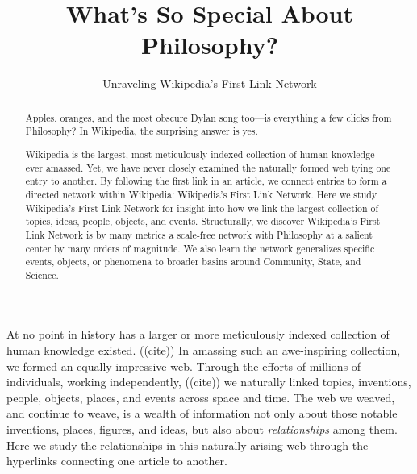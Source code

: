 \documentclass[twoside]{article}
\title{\vspace{-5mm}%
	\fontsize{24pt}{12pt}\selectfont
	\textbf{What's So Special About Philosophy?} 
	}
\author{%
\fontsize{14pt}{14pt}\selectfont
	Unraveling Wikipedia's First Link Network \vspace{-2mm}\\
	}
\date{}
\newcommand{\green}[1]{{\leavevmode\color{javagreen}{#1}}} %
\begin{document}
\maketitle
\thispagestyle{fancy}

\begin{abstract}
\fontsize{12pt}{12pt}
\selectfont

Apples, oranges, and the most obscure Dylan song too---is everything a few clicks from Philosophy? In Wikipedia, the surprising answer is yes. 

Wikipedia is the largest, most meticulously indexed collection of human knowledge ever amassed. Yet, we have never closely examined the naturally formed web tying one entry to another. By following the first link in an article, we connect entries to form a directed network within Wikipedia: Wikipedia's First Link Network. Here we study Wikipedia's First Link Network for insight into how we link the largest collection of topics, ideas, people, objects, and events.  Structurally, we discover Wikipedia's First Link Network is by many metrics a scale-free network with Philosophy at a salient center by many orders of magnitude. 
We also learn the network generalizes specific events, objects, or phenomena to broader basins around Community, State, and Science. 


\green{
conclusions to mention
\begin{itemize}
    \item finding many small-world phenomenan in the number of first links flowing through a page, the path lenghts, and ...\\
    \item also cementing Philosophy as an extremely peculiar article, orders of magnitude away from other article in Wikipedia by our metrics.
    \item links generalize specific event, object, or phenomemon to a broader concept. Mention synonyms
\end{itemize}
}
\end{abstract}

\fontsize{11pt}{11pt}
\selectfont

At no point in history has a larger or more meticulously indexed collection of human knowledge existed.
((cite))
In amassing such an awe-inspiring collection, we formed an equally impressive web. 
Through the efforts of millions of individuals, working independently,
((cite))
we naturally linked topics, inventions, people, objects, places, and events across space and time.
The web we weaved, and continue to weave, is a wealth of information not only about those notable inventions, 
places, figures, and ideas, but also about \textit{relationships} among them.
Here we study the relationships in this naturally arising web through the hyperlinks connecting one article to another.
\end{document}
